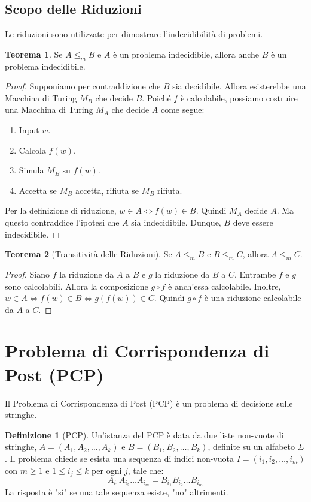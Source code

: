 \documentclass[a4paper]{article}
\theoremstyle{definition} %
\newtheorem{theorem}{Teorema}
\newtheorem{definition}{Definizione}
\theoremstyle{remark} %
\begin{document}
\subsection{Scopo delle Riduzioni}

Le riduzioni sono utilizzate per dimostrare l'indecidibilità di problemi.
\begin{theorem}
Se $A \le_m B$ e $A$ è un problema indecidibile, allora anche $B$ è un problema indecidibile.
\end{theorem}
\begin{proof}
Supponiamo per contraddizione che $B$ sia decidibile. Allora esisterebbe una Macchina di Turing $M_B$ che decide $B$.
Poiché $f$ è calcolabile, possiamo costruire una Macchina di Turing $M_A$ che decide $A$ come segue:
\begin{enumerate}
    \item Input $w$.
    \item Calcola $f(w)$.
    \item Simula $M_B$ su $f(w)$.
    \item Accetta se $M_B$ accetta, rifiuta se $M_B$ rifiuta.
\end{enumerate}
Per la definizione di riduzione, $w \in A \iff f(w) \in B$. Quindi $M_A$ decide $A$. Ma questo contraddice l'ipotesi che $A$ sia indecidibile. Dunque, $B$ deve essere indecidibile.
\end{proof}

\begin{theorem}[Transitività delle Riduzioni]
Se $A \le_m B$ e $B \le_m C$, allora $A \le_m C$.
\end{theorem}
\begin{proof}
Siano $f$ la riduzione da $A$ a $B$ e $g$ la riduzione da $B$ a $C$.
Entrambe $f$ e $g$ sono calcolabili. Allora la composizione $g \circ f$ è anch'essa calcolabile.
Inoltre, $w \in A \iff f(w) \in B \iff g(f(w)) \in C$.
Quindi $g \circ f$ è una riduzione calcolabile da $A$ a $C$.
\end{proof}

\section{Problema di Corrispondenza di Post (PCP)}

Il Problema di Corrispondenza di Post (PCP) è un problema di decisione sulle stringhe.

\begin{definition}[PCP]
Un'istanza del PCP è data da due liste non-vuote di stringhe, $A = (A_1, A_2, \dots, A_k)$ e $B = (B_1, B_2, \dots, B_k)$, definite su un alfabeto $\Sigma$.
Il problema chiede se esista una sequenza di indici non-vuota $I = (i_1, i_2, \dots, i_m)$ con $m \ge 1$ e $1 \le i_j \le k$ per ogni $j$, tale che:
$$A_{i_1} A_{i_2} \dots A_{i_m} = B_{i_1} B_{i_2} \dots B_{i_m}$$
La risposta è "sì" se una tale sequenza esiste, "no" altrimenti.
\end{definition}
\end{document}
